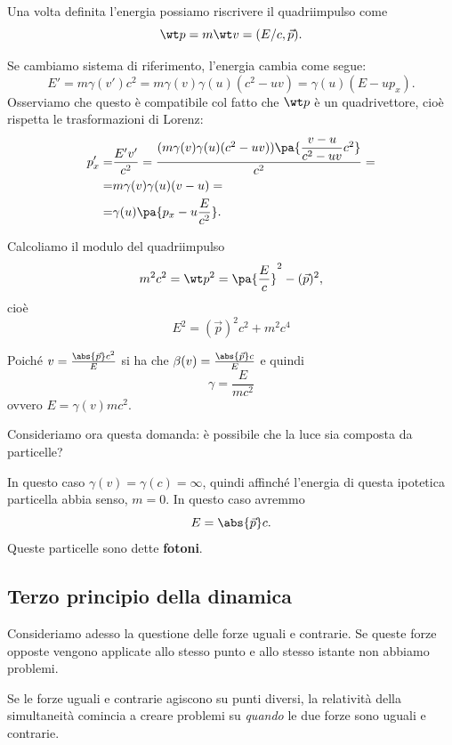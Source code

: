 \begin{remark}
Una volta definita l'energia possiamo riscrivere il quadriimpulso come
\[\wt p=m\wt v=(E/c,\vec p).\]
\end{remark}


\begin{remark}
Se cambiamo sistema di riferimento, l'energia cambia come segue:
\[E'=m\gamma(v')c^2=m\gamma(v)\gamma(u)(c^2-uv)=\gamma(u)(E-up_x).\]
Osserviamo che questo \`e compatibile col fatto che $\wt p$ \`e un quadrivettore, cio\`e rispetta le trasformazioni di Lorenz:
\begin{align*}
p'_x=&\frac{E' v'}{c^2}=\frac{(m\gamma(v)\gamma(u)(c^2-uv))\pa{\dfrac{v-u}{c^2-uv}c^2}}{c^2}=\\
=&m\gamma(v)\gamma(u)(v-u)=\\
=&\gamma(u)\pa{p_x-u\frac{E}{c^2}}.
\end{align*}
\end{remark}

\begin{remark}
Calcoliamo il modulo del quadriimpulso
\[m^2c^2=\wt p^2=\pa{\frac Ec}^2-(\vec p)^2,\]
cio\`e
\[\boxed{E^2=(\vec p)^2c^2+m^2c^4}\]
\end{remark}

\begin{remark}
Poich\'e $v=\frac{\abs{\vec p}c^2}E$ si ha che $\beta(v)=\frac{\abs{\vec p}c}E$ e quindi
\[\boxed{\gamma=\frac{E}{mc^2}}\]
ovvero $E=\gamma(v)mc^2$.
\end{remark}

\noindent Consideriamo ora questa domanda: \`e possibile che la luce sia composta da particelle?\medskip

\noindent In questo caso $\gamma(v)=\gamma(c)=\infty$, quindi affinch\'e l'energia di questa ipotetica particella abbia senso, $m=0$. In questo caso avremmo
\[E=\abs{\vec p}c.\]
Queste particelle sono dette \textbf{fotoni}.

\subsection{Terzo principio della dinamica}
Consideriamo adesso la questione delle forze uguali e contrarie. Se queste forze opposte vengono applicate allo stesso punto e allo stesso istante non abbiamo problemi.\medskip

\noindent Se le forze uguali e contrarie agiscono su punti diversi, la relativit\`a della simultaneit\`a comincia a creare problemi su \textit{quando} le due forze sono uguali e contrarie.\medskip

